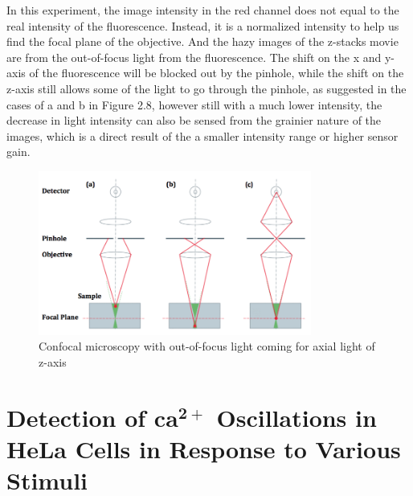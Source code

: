 \documentclass[a4paper,english,12pt,bibliography=totoc]{scrreprt}
\begin{document}
In this experiment, the image intensity in the red channel does not equal to the real intensity of the fluorescence. Instead, it is a normalized intensity to help us find the focal plane of the objective. And the hazy images of the z-stacks movie are from the out-of-focus light from the fluorescence. The shift on the x and y-axis of the fluorescence will be blocked out by the pinhole, while the shift on the z-axis still allows some of the light to go through the pinhole, as suggested in the cases of a and b in Figure 2.8, however still with a much lower intensity, the decrease in light intensity can also be sensed from the grainier nature of the images, which is a direct result of the a smaller intensity range or higher sensor gain.

\begin{figure}[H]
    \centering
    \includegraphics[width = 0.8\textwidth]{Images/confocal microscopy.png}
    \caption{Confocal microscopy with out-of-focus light coming for axial light of z-axis \cite{confocal}}
    \label{fig:enter-label}
\end{figure}

\chapter{Detection of $\mathbf{ca^{2+}}$ Oscillations in HeLa Cells in Response to Various Stimuli}
\label{cha:experiment2}
\end{document}
